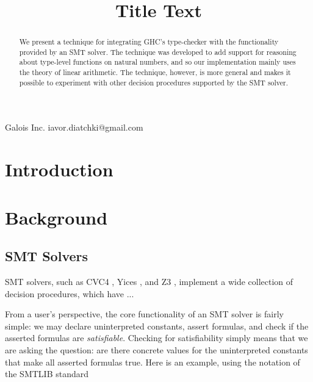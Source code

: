 \documentclass{sigplanconf}
\begin{document}
\setlength{\pdfpageheight}{\paperheight}
\setlength{\pdfpagewidth}{\paperwidth}



\title{Title Text}

           {Galois Inc.}
           {iavor.diatchki@gmail.com}

\maketitle

\begin{abstract}
We present a technique for integrating GHC's type-checker with the
functionality provided by an SMT solver.  The technique was developed
to add support for reasoning about type-level functions on natural
numbers, and so our implementation mainly uses the theory of linear
arithmetic.  The technique, however, is more general and makes it
possible to experiment with other decision procedures supported by
the SMT solver.
\end{abstract}


\section{Introduction}



\section{Background}

\subsection {SMT Solvers}

SMT solvers, such as CVC4 \cite{cvc4}, Yices \cite{yices}, and Z3
\cite{z3}, implement a wide collection of decision procedures,
which have ...

From a user's perspective, the core functionality of an SMT solver is fairly
simple: we may declare uninterpreted constants, assert formulas,
and check if the asserted formulas are {\em satisfiable}.  Checking
for satisfiability simply means that we are asking the
question: are there concrete values for the uninterpreted constants
that make all asserted formulas true.  Here is an example, using
the notation of the SMTLIB standard \cite{smtlib}
\end{document}
